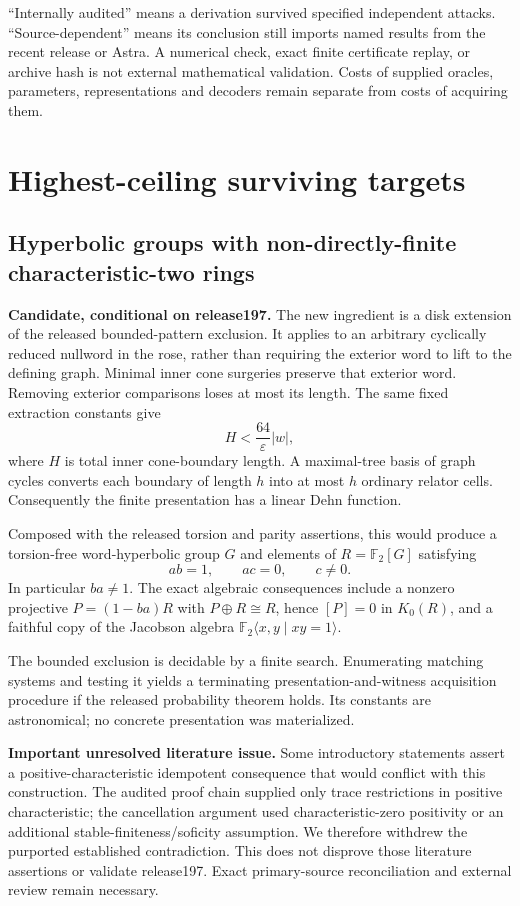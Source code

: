 \documentclass[11pt]{article}
\begin{document}
``Internally audited'' means a derivation survived specified independent attacks. ``Source-dependent'' means its conclusion still imports named results from the recent release or Astra. A numerical check, exact finite certificate replay, or archive hash is not external mathematical validation. Costs of supplied oracles, parameters, representations and decoders remain separate from costs of acquiring them.

\section{Highest-ceiling surviving targets}
\subsection{Hyperbolic groups with non-directly-finite characteristic-two rings}
\textbf{Candidate, conditional on release197.} The new ingredient is a disk extension of the released bounded-pattern exclusion. It applies to an arbitrary cyclically reduced nullword in the rose, rather than requiring the exterior word to lift to the defining graph. Minimal inner cone surgeries preserve that exterior word. Removing exterior comparisons loses at most its length. The same fixed extraction constants give
\[
 H < \frac{64}{\varepsilon}|w|,
\]
where $H$ is total inner cone-boundary length. A maximal-tree basis of graph cycles converts each boundary of length $h$ into at most $h$ ordinary relator cells. Consequently the finite presentation has a linear Dehn function.

Composed with the released torsion and parity assertions, this would produce a torsion-free word-hyperbolic group $G$ and elements of $R=\mathbb F_2[G]$ satisfying
\[
 ab=1,\qquad ac=0,\qquad c\ne0.
\]
In particular $ba\ne1$. The exact algebraic consequences include a nonzero projective $P=(1-ba)R$ with $P\oplus R\cong R$, hence $[P]=0$ in $K_0(R)$, and a faithful copy of the Jacobson algebra $\mathbb F_2\langle x,y\mid xy=1\rangle$.

The bounded exclusion is decidable by a finite search. Enumerating matching systems and testing it yields a terminating presentation-and-witness acquisition procedure if the released probability theorem holds. Its constants are astronomical; no concrete presentation was materialized.

\textbf{Important unresolved literature issue.} Some introductory statements assert a positive-characteristic idempotent consequence that would conflict with this construction. The audited proof chain supplied only trace restrictions in positive characteristic; the cancellation argument used characteristic-zero positivity or an additional stable-finiteness/soficity assumption. We therefore withdrew the purported established contradiction. This does not disprove those literature assertions or validate release197. Exact primary-source reconciliation and external review remain necessary.
\end{document}
